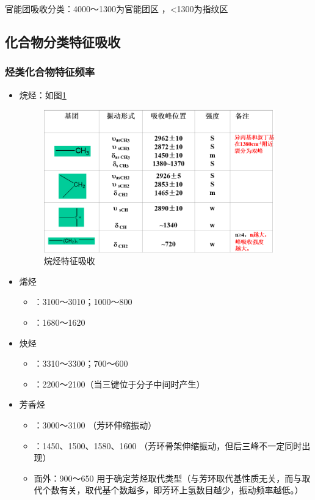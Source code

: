\begin{note}                  
	官能团吸收分类：4000～1300为官能团区 ，<1300为指纹区
\end{note}
\subsection{化合物分类特征吸收}
\subsubsection*{ 烃类化合物特征频率}
\begin{itemize}
	\item 烷烃：如图\ref{fig:chp5_ch}
	\begin{figure}[ht]
		\centering
		\includegraphics[width=10cm]{image/chp5_ch.png}
		\caption{烷烃特征吸收}
		\label{fig:chp5_ch}
	\end{figure}
	\item 烯烃
	\begin{itemize}                    
		\item {}：3100～3010；1000～800
		\item {}：1680～1620
	\end{itemize}
	\item 炔烃
	\begin{itemize}                  
		\item {}：3310～3300；700～600
		\item {}：2200～2100（当三键位于分子中间时产生）
	\end{itemize}
	\item 芳香烃
	\begin{itemize}         
		\item {}：3000～3100 （芳环伸缩振动）
		\item {}：1450、1500、1580、1600 （芳环骨架伸缩振动，但后三峰不一定同时出现）
		\item 面外：900～650  用于确定芳烃取代类型（与芳环取代基性质无关，而与取代个数有关，取代基个数越多，即芳环上氢数目越少，振动频率越低。）

\end{itemize}
\end{itemize}
